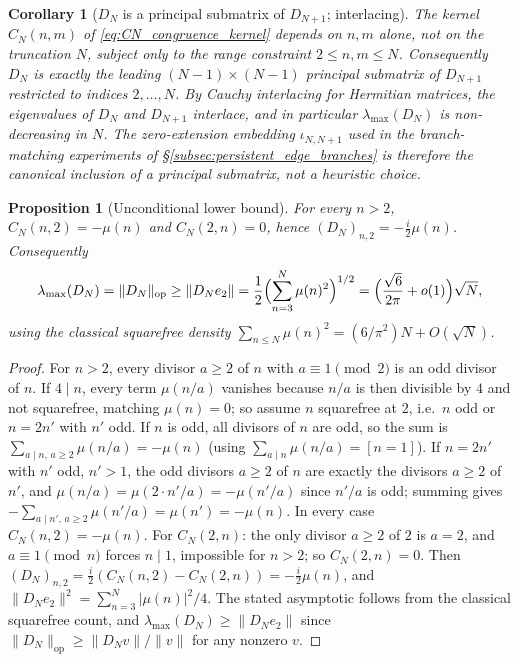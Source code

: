 \documentclass[11pt]{amsart}
\numberwithin{equation}{section}
\theoremstyle{plain}
\newtheorem{proposition}[theorem]{Proposition}
\newtheorem{corollary}[theorem]{Corollary}
\theoremstyle{definition}
\theoremstyle{remark}
\newcommand{\mob}{\mu}
\begin{document}
\begin{corollary}[$D_N$ is a principal submatrix of $D_{N+1}$; interlacing]
\label{cor:principal_submatrix}
The kernel $C_N(n,m)$ of \eqref{eq:CN_congruence_kernel} depends on $n,m$ alone, not on the truncation $N$, subject only to the range constraint $2\le n,m\le N$.  Consequently $D_N$ is exactly the leading $(N-1)\times(N-1)$ principal submatrix of $D_{N+1}$ restricted to indices $2,\ldots,N$.  By Cauchy interlacing for Hermitian matrices, the eigenvalues of $D_N$ and $D_{N+1}$ interlace, and in particular $\lambda_{\max}(D_N)$ is non-decreasing in $N$.  The zero-extension embedding $\iota_{N,N+1}$ used in the branch-matching experiments of \S\ref{subsec:persistent_edge_branches} is therefore the canonical inclusion of a principal submatrix, not a heuristic choice.
\end{corollary}

\begin{proposition}[Unconditional lower bound]
\label{prop:lower_bound}
For every $n>2$, $C_N(n,2)=-\mob(n)$ and $C_N(2,n)=0$, hence $(D_N)_{n,2}=-\tfrac i2\mob(n)$.  Consequently
\begin{equation}
\lambda_{\max}(D_N)=\|D_N\|_{\mathrm{op}}\ge\|D_Ne_2\|
=\frac12\Bigl(\sum_{n=3}^N\mob(n)^2\Bigr)^{1/2}
=\Bigl(\frac{\sqrt6}{2\pi}+o(1)\Bigr)\sqrt N,
\label{eq:lower_bound}
\end{equation}
using the classical squarefree density $\sum_{n\le N}\mob(n)^2=(6/\pi^2)N+O(\sqrt N)$.
\end{proposition}

\begin{proof}
For $n>2$, every divisor $a\ge2$ of $n$ with $a\equiv1\pmod2$ is an odd divisor of $n$.  If $4\mid n$, every term $\mob(n/a)$ vanishes because $n/a$ is then divisible by $4$ and not squarefree, matching $\mob(n)=0$; so assume $n$ squarefree at $2$, i.e.\ $n$ odd or $n=2n'$ with $n'$ odd.  If $n$ is odd, all divisors of $n$ are odd, so the sum is $\sum_{a\mid n,\,a\ge2}\mob(n/a)=-\mob(n)$ (using $\sum_{a\mid n}\mob(n/a)=[n=1]$).  If $n=2n'$ with $n'$ odd, $n'>1$, the odd divisors $a\ge2$ of $n$ are exactly the divisors $a\ge2$ of $n'$, and $\mob(n/a)=\mob(2\cdot n'/a)=-\mob(n'/a)$ since $n'/a$ is odd; summing gives $-\sum_{a\mid n',\,a\ge2}\mob(n'/a)=\mob(n')=-\mob(n)$.  In every case $C_N(n,2)=-\mob(n)$.  For $C_N(2,n)$: the only divisor $a\ge2$ of $2$ is $a=2$, and $a\equiv1\pmod n$ forces $n\mid1$, impossible for $n>2$; so $C_N(2,n)=0$.  Then $(D_N)_{n,2}=\tfrac i2(C_N(n,2)-C_N(2,n))=-\tfrac i2\mob(n)$, and $\|D_Ne_2\|^2=\sum_{n=3}^N|\mob(n)|^2/4$.  The stated asymptotic follows from the classical squarefree count, and $\lambda_{\max}(D_N)\ge\|D_Ne_2\|$ since $\|D_N\|_{\mathrm{op}}\ge\|D_Nv\|/\|v\|$ for any nonzero $v$.
\end{proof}
\end{document}
